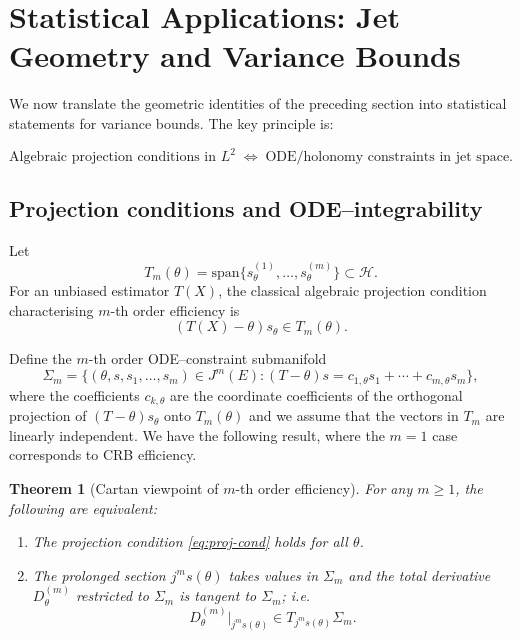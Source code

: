 \documentclass[3p,times]{elsarticle}
\newtheorem{theorem}{Theorem}[section]
\begin{document}
\section{Statistical Applications: Jet Geometry and Variance Bounds}
\label{sec:applications}

We now translate the geometric identities of the preceding section into
statistical statements for variance bounds.  The key principle is:

\[
\boxed{
\text{Algebraic projection conditions in }L^2
\;\Longleftrightarrow\;
\text{ODE/holonomy constraints in jet space}.
}
\]
\subsection{Projection conditions and ODE--integrability}

Let
\[
T_m(\theta)=
\mathrm{span}\{s_\theta^{(1)},\dots,s_\theta^{(m)}\}\subset \mathcal{H}.
\]
For an unbiased estimator $T(X)$, the classical algebraic
projection condition characterising $m$-th order efficiency is
\begin{equation}\label{eq:proj-cond}
(T(X)-\theta)s_\theta \in T_m(\theta).
\end{equation}

Define the $m$-th order ODE--constraint submanifold
\begin{equation}
\label{eq:sm}
\Sigma_m
=
\bigl\{
(\theta,s,s_1,\dots,s_m)\in J^m(E):
(T-\theta)s=c_{1,\theta}s_1+\cdots+c_{m,\theta}s_m
\bigr\},
\end{equation}
where the coefficients $c_{k,\theta}$ are the coordinate coefficients of the
orthogonal projection of $(T-\theta)s_\theta$ onto $T_m(\theta)$ and we assume that the vectors in \(T_m\) are linearly independent. We have the following result, where the \(m=1\) case corresponds to CRB efficiency.

\begin{theorem}[Cartan viewpoint of $m$-th order efficiency]
\label{thm:equivalence}
For any $m\ge1$, the following are equivalent:
\begin{enumerate}
\item The projection condition \eqref{eq:proj-cond} holds for all $\theta$.
\item The prolonged section $j^m s(\theta)$ takes values in $\Sigma_m$ and
the total derivative $D_\theta^{(m)}$ restricted to $\Sigma_m$ is tangent to
$\Sigma_m$; i.e.
\[
D_\theta^{(m)}\big|_{j^ms(\theta)}\in T_{j^m s(\theta)}\Sigma_m.
\]
\end{enumerate}
\end{theorem}
\end{document}
